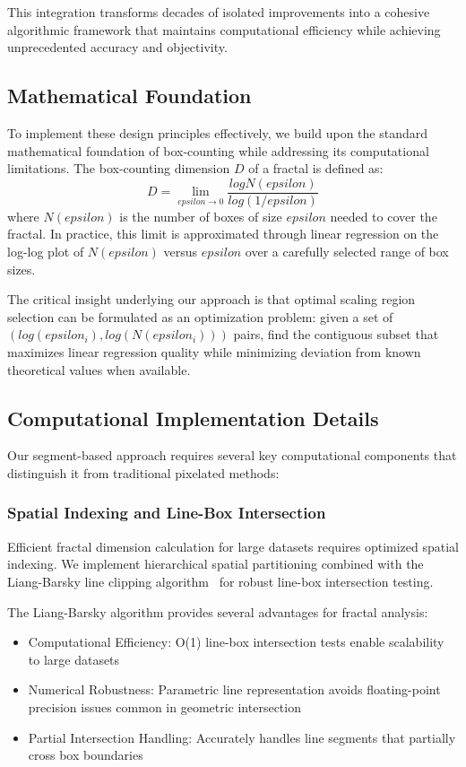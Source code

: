 \documentclass[preprint,12pt]{elsarticle}
\def\textbf#1{#1}%
\def\log{log}%
\def\epsilon{epsilon}%
\begin{document}
This integration transforms decades of isolated improvements into a cohesive algorithmic framework that maintains computational efficiency while achieving unprecedented accuracy and objectivity.

\subsection{Mathematical Foundation}

To implement these design principles effectively, we build upon the standard mathematical foundation of box-counting while addressing its computational limitations.
The box-counting dimension $D$ of a fractal is defined as:
\begin{equation}
D = \lim_{\epsilon \to 0} \frac{\log N(\epsilon)}{\log(1/\epsilon)}
\label{eq:box_counting_def}
\end{equation}
where $N(\epsilon)$ is the number of boxes of size $\epsilon$ needed to cover the fractal. In practice, this limit is approximated through linear regression on the log-log plot of $N(\epsilon)$ versus $\epsilon$ over a carefully selected range of box sizes.

The critical insight underlying our approach is that optimal scaling region selection can be formulated as an optimization problem: given a set of $(log(\epsilon_i), log(N(\epsilon_i)))$ pairs, find the contiguous subset that maximizes linear regression quality while minimizing deviation from known theoretical values when available.

\subsection{Computational Implementation Details}

Our segment-based approach requires several key computational components that distinguish it from traditional pixelated methods:

\subsubsection{Spatial Indexing and Line-Box Intersection}

Efficient fractal dimension calculation for large datasets requires optimized spatial indexing. We implement hierarchical spatial partitioning combined with the Liang-Barsky line clipping algorithm~\cite{liang1984} for robust line-box intersection testing.

The Liang-Barsky algorithm provides several advantages for fractal analysis:
\begin{itemize}
\item \textbf{Computational Efficiency}: O(1) line-box intersection tests enable scalability to large datasets
\item \textbf{Numerical Robustness}: Parametric line representation avoids floating-point precision issues common in geometric intersection
\item \textbf{Partial Intersection Handling}: Accurately handles line segments that partially cross box boundaries
\end{itemize}
\end{document}
